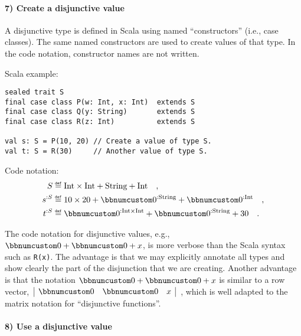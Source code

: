 \paragraph{7) Create a disjunctive value}

A disjunctive type is defined in Scala using named \textsf{``}constructors\textsf{''}
(i.e., case classes). The same named constructors are used to create
values of that type. In the code notation, constructor names are not
written.

Scala example:
\begin{lstlisting}
sealed trait S
final case class P(w: Int, x: Int)  extends S
final case class Q(y: String)       extends S
final case class R(z: Int)          extends S

val s: S = P(10, 20) // Create a value of type S.
val t: S = R(30)     // Another value of type S.
\end{lstlisting}
Code notation:
\begin{align*}
S & \triangleq\text{Int}\times\text{Int}+\text{String}+\text{Int}\quad,\\
s^{:S} & \triangleq10\times20+\bbnum 0^{:\text{String}}+\bbnum 0^{:\text{Int}}\quad,\\
t^{:S} & \triangleq\bbnum 0^{:\text{Int}\times\text{Int}}+\bbnum 0^{:\text{String}}+30\quad.
\end{align*}

The code notation for disjunctive values, e.g., $\bbnum 0+\bbnum 0+x$,
is more verbose than the Scala syntax such as \lstinline!R(x)!. The
advantage is that we may explicitly annotate all types and show clearly
the part of the disjunction that we are creating. Another advantage
is that the notation $\bbnum 0+\bbnum 0+x$ is similar to a row vector,
$\,\begin{array}{|ccc|}
\bbnum 0 & \bbnum 0 & x\end{array}$~, which is well adapted to the matrix notation for \textsf{``}disjunctive
functions\textsf{''}.

\paragraph{8) Use a disjunctive value}

